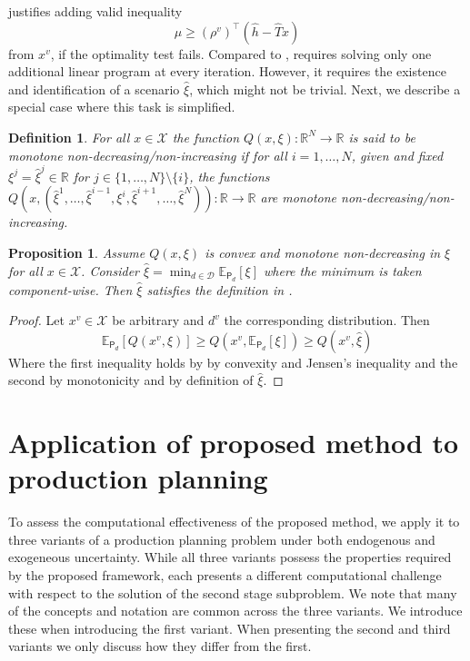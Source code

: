 \documentclass[12pt]{article}
\newtheorem{proposition}[theorem]{Proposition}%
\theoremstyle{thmstylethree}%
\newtheorem{definition}{Definition}%
\newcommand{\mtc}[1] {\mathcal{#1}}
\newcommand{\pr}[1]{\ensuremath{\mathsf{#1}}}
\def\R{\ensuremath{\mathbb{R}}}
\def\Ex{\ensuremath{\mathbb{E}}}
\begin{document}
 justifies adding valid inequality
\begin{equation}\label{eq:ext:vi2}\mu \geq (\rho^v)^\top(\hat{h}-\hat{T}x)
\end{equation}
from $x^v$, if the optimality test fails.
Compared to ,  requires solving only one additional linear program at every iteration.
However, it requires the existence and identification of a scenario $\hat{\xi}$, which might not be trivial. Next, we describe a special case where this task is simplified.
\begin{definition}
  For all $x\in \mtc{X}$ the function $Q(x,\xi):\R^N\to \R$ is said to be \textit{monotone} non-decreasing/non-increasing if for all $i=1,\ldots,N$, given and fixed $\xi^j=\hat{\xi}^j\in \R$ for $j\in\{1,\ldots,N\}\setminus\{i\}$, the functions $Q(x,(\hat{\xi}^1,\ldots,\hat{\xi}^{i-1},\xi^i,\hat{\xi}^{i+1},\ldots,\hat{\xi}^{N})):\R\to \R$ are monotone non-decreasing/non-increasing.
\end{definition}



\begin{proposition}\label{prop:min_ev}
  Assume $Q(x,\xi)$ is convex and monotone non-decreasing in $\xi$ for all $x\in\mtc{X}$.
  Consider $\hat{\xi}=\min_{d\in\mtc{D}}\Ex_{\pr{P}_d}[\xi]$ where the minimum is taken component-wise.
  Then $\hat{\xi}$ satisfies the definition in .
\end{proposition}
  \begin{proof}
    Let $x^v\in \mtc{X}$ be arbitrary and $d^v$ the corresponding distribution.
    Then
    $$\Ex_{\pr{P}_d}[Q(x^v,\xi)]\geq Q(x^v,\Ex_{\pr{P}_d}[\xi])\geq Q(x^v,\hat{\xi})$$
    Where the first inequality holds by by convexity and Jensen's inequality and the second by monotonicity and by definition of $\hat{\xi}$.
  \end{proof}





\section{Application of proposed method to production planning}
\label{sec:comp_setting}

To assess the computational effectiveness of the proposed method, we apply it to three variants of a production planning problem under both endogenous and exogeneous uncertainty. While all three variants possess the properties required by the proposed framework, each presents a different computational challenge with respect to the solution of the second stage subproblem. We note that many of the concepts and notation are common across the three variants. We introduce these when introducing the first variant. When presenting the second and third variants we only discuss how they differ from the first. 
\end{document}
